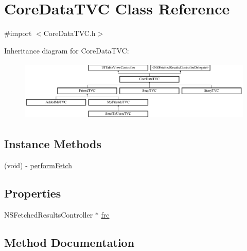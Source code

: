 \hypertarget{interface_core_data_t_v_c}{}\section{Core\+Data\+T\+VC Class Reference}
\label{interface_core_data_t_v_c}


{\ttfamily \#import $<$Core\+Data\+T\+V\+C.\+h$>$}

Inheritance diagram for Core\+Data\+T\+VC\+:\begin{figure}[H]
\begin{center}
\leavevmode
\includegraphics[height=2.880659cm]{interface_core_data_t_v_c}
\end{center}
\end{figure}
\subsection*{Instance Methods}
\begin{DoxyCompactItemize}
\item 
(void) -\/ \hyperlink{interface_core_data_t_v_c_a4d8c0171cd7b6c9f442c7e57d236a0b6}{perform\+Fetch}
\end{DoxyCompactItemize}
\subsection*{Properties}
\begin{DoxyCompactItemize}
\item 
N\+S\+Fetched\+Results\+Controller $\ast$ \hyperlink{interface_core_data_t_v_c_adee402ae0eb3dd0c2b08828bc5fdf56c}{frc}
\end{DoxyCompactItemize}


\subsection{Method Documentation}
\hypertarget{interface_core_data_t_v_c_a4d8c0171cd7b6c9f442c7e57d236a0b6}{}\label{interface_core_data_t_v_c_a4d8c0171cd7b6c9f442c7e57d236a0b6} 
